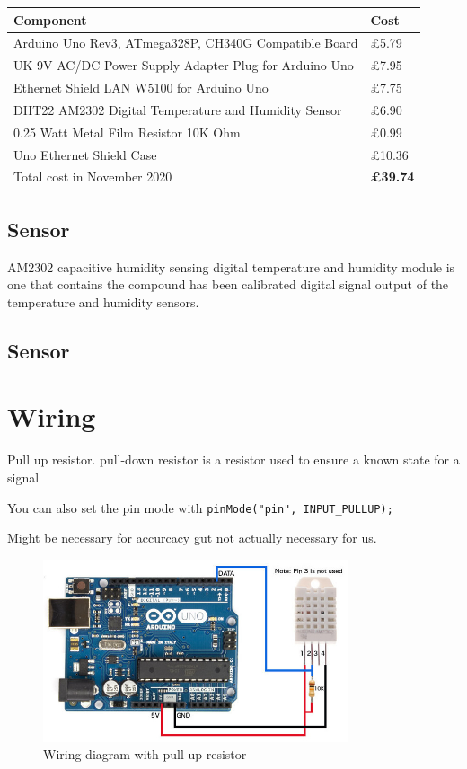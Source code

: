 \documentclass[a4paper, 12pt]{article}
\begin{document}
\begin{tabular}{ll}
  \textbf{Component} & \textbf{Cost} \\ 
  \hline
  Arduino Uno Rev3, ATmega328P, CH340G Compatible Board & \pounds 5.79 \\
  UK 9V AC/DC Power Supply Adapter Plug for Arduino Uno & \pounds 7.95 \\
  Ethernet Shield LAN W5100 for Arduino Uno & \pounds 7.75 \\
  DHT22 AM2302 Digital Temperature and Humidity Sensor & \pounds 6.90 \\
  0.25 Watt Metal Film Resistor 10K Ohm & \pounds 0.99 \\
  Uno Ethernet Shield Case & \pounds 10.36 \\
  \hline
  Total cost in November 2020 & \textbf{\pounds 39.74}  \\
\end{tabular}

\subsection{Sensor}

AM2302 capacitive humidity sensing digital temperature and humidity module is one that contains the
compound has been calibrated digital signal output of the temperature and humidity sensors. 



\subsection{Sensor}

\section{Wiring}

Pull up resistor.
pull-down resistor is a resistor used to ensure a known state for a signal


You can also set the pin mode with \verb|pinMode("pin", INPUT_PULLUP);|

Might be necessary for accurcacy gut not actually necessary for us.

\begin{figure}[H]
  \centering
  \includegraphics[width=0.8\textwidth]{wiring-dht22.jpg}
  \caption{Wiring diagram with pull up resistor}
\end{figure}
\end{document}
